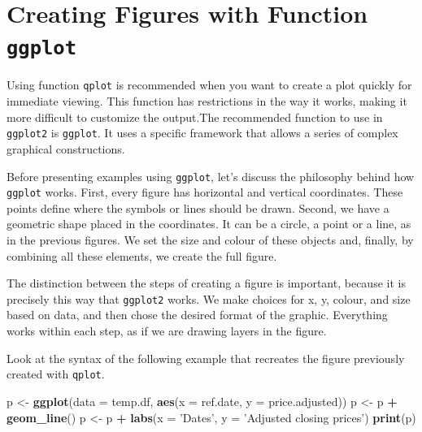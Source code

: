 \documentclass[11pt,]{book}
\newenvironment{Shaded}{\begin{snugshade}}{\end{snugshade}}
\newcommand{\KeywordTok}[1]{\textcolor[rgb]{0.27,0.27,0.27}{\textbf{#1}}}
\newcommand{\DataTypeTok}[1]{\textcolor[rgb]{0.27,0.27,0.27}{#1}}
\newcommand{\StringTok}[1]{\textcolor[rgb]{0.5,0.5,0.5}{#1}}
\newcommand{\OperatorTok}[1]{\textcolor[rgb]{0.81,0.36,0.00}{\textbf{#1}}}
\newcommand{\NormalTok}[1]{#1}
\begin{document}
\section{\texorpdfstring{Creating Figures with Function
\texttt{ggplot}}{Creating Figures with Function ggplot}}\label{using-ggplot}

Using function \texttt{qplot} is recommended when you want to create a
plot quickly for immediate viewing. This function has restrictions in
the way it works, making it more difficult to customize the output.The
recommended function to use in \texttt{ggplot2} is \texttt{ggplot}. It
uses a specific framework that allows a series of complex graphical
constructions. 

Before presenting examples using \texttt{ggplot}, let's discuss the
philosophy behind how \texttt{ggplot} works. First, every figure has
horizontal and vertical coordinates. These points define where the
symbols or lines should be drawn. Second, we have a geometric shape
placed in the coordinates. It can be a circle, a point or a line, as in
the previous figures. We set the size and colour of these objects and,
finally, by combining all these elements, we create the full figure.

The distinction between the steps of creating a figure is important,
because it is precisely this way that \texttt{ggplot2} works. We make
choices for x, y, colour, and size based on data, and then chose the
desired format of the graphic. Everything works within each step, as if
we are drawing layers in the figure.

Look at the syntax of the following example that recreates the figure
previously created with \texttt{qplot}. 
 

\begin{Shaded}
\begin{Highlighting}[]
\NormalTok{p <-}\StringTok{ }\KeywordTok{ggplot}\NormalTok{(}\DataTypeTok{data =}\NormalTok{ temp.df, }\KeywordTok{aes}\NormalTok{(}\DataTypeTok{x =}\NormalTok{ ref.date, }\DataTypeTok{y =}\NormalTok{ price.adjusted))}
\NormalTok{p <-}\StringTok{ }\NormalTok{p }\OperatorTok{+}\StringTok{ }\KeywordTok{geom_line}\NormalTok{()}
\NormalTok{p <-}\StringTok{ }\NormalTok{p }\OperatorTok{+}\StringTok{ }\KeywordTok{labs}\NormalTok{(}\DataTypeTok{x =} \StringTok{'Dates'}\NormalTok{, }\DataTypeTok{y =} \StringTok{'Adjusted closing prices'}\NormalTok{)}
\KeywordTok{print}\NormalTok{(p)}
\end{Highlighting}
\end{Shaded}
\end{document}
